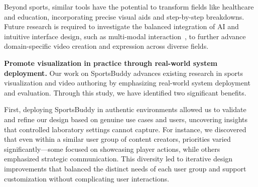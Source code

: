 Beyond sports, similar tools have the potential to transform fields like healthcare and education, incorporating precise visual aids and step-by-step breakdowns. 
% 
Future research is required to investigate the balanced integration of AI and intuitive interface design, such as multi-modal interaction~\cite{wang2024lave}, to further advance domain-specific video creation and expression across diverse fields.




\vspace{1mm}
\noindent\textbf{Promote visualization in practice through real-world system deployment.}
Our work on SportsBuddy advances existing research in sports visualization and video authoring by emphasizing real-world system deployment and evaluation. Through this study, we have identified two significant benefits.

First, deploying SportsBuddy in authentic environments allowed us to validate and refine our design based on genuine use cases and users, uncovering insights that controlled laboratory settings cannot capture. For instance, we discovered that even within a similar user group of content creators, priorities varied significantly—some focused on showcasing player actions, while others emphasized strategic communication. This diversity led to iterative design improvements that balanced the distinct needs of each user group and support customization without complicating user interactions. 


